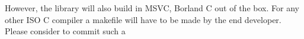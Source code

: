 However, the library will also build in MSVC, Borland C out of the box.  For any other ISO C
compiler a makefile will have to be made by the end developer.  Please consider to commit such a
